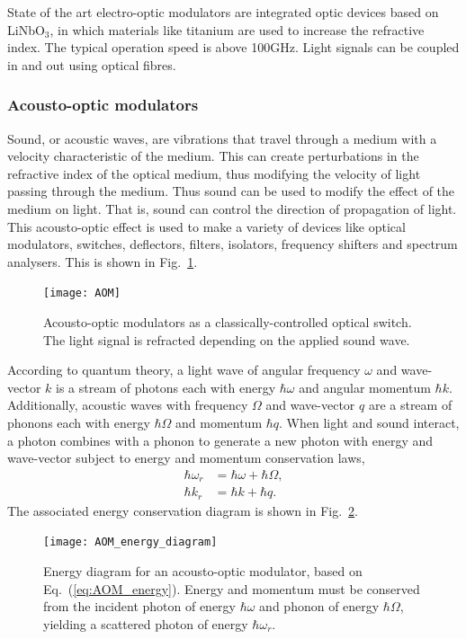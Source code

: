 State of the art electro-optic modulators are integrated optic devices based on LiNbO$_3$, in which materials like titanium are used to increase the refractive index. The typical operation speed is above 100GHz. Light signals can be coupled in and out using optical fibres.

%
%

\subsubsection{Acousto-optic modulators} 

Sound, or acoustic waves, are vibrations that travel through a medium with a velocity characteristic of the medium. This can create perturbations in the refractive index of the optical medium, thus modifying the velocity of light passing through the medium. Thus sound can be used to modify the effect of the medium on light. That is, sound can control the direction of propagation of light. This acousto-optic effect is used to make a variety of devices like optical modulators, switches, deflectors, filters, isolators, frequency shifters and spectrum analysers. This is shown in Fig.~\ref{fig:AOM}.

\begin{figure}[!htbp]
\texttt{[image: AOM]}
\caption{Acousto-optic modulators as a classically-controlled optical switch. The light signal is refracted depending on the applied sound wave.}\label{fig:AOM}
\end{figure}

According to quantum theory, a light wave of angular frequency $\omega$ and wave-vector $k$ is a stream of photons each with energy $\hbar\omega$ and angular momentum $\hbar k$. Additionally, acoustic waves with frequency $\Omega$ and wave-vector $q$ are a stream of phonons each with energy $\hbar\Omega$ and momentum $\hbar q$. When light and sound interact, a photon combines with a phonon to generate a new photon with energy and wave-vector subject to energy and momentum conservation laws, 
\begin{align}\label{eq:AOM_energy}
\hbar\omega_r &= \hbar\omega + \hbar\Omega,\nonumber\\
\hbar k_r &= \hbar k + \hbar q.
\end{align}
The associated energy conservation diagram is shown in Fig.~\ref{fig:AOM_energy_diagram}.

\begin{figure}[!htbp]
\texttt{[image: AOM\_energy\_diagram]}
\caption{Energy diagram for an acousto-optic modulator, based on Eq.~(\ref{eq:AOM_energy}). Energy and momentum must be conserved from the incident photon of energy $\hbar\omega$ and phonon of energy $\hbar\Omega$, yielding a scattered photon of energy $\hbar\omega_r$.}\label{fig:AOM_energy_diagram}
\end{figure}

